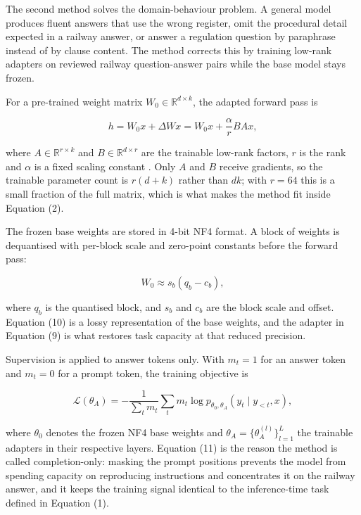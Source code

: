 \documentclass{article}
\begin{document}
The second method solves the domain-behaviour problem. A general model produces fluent answers that use the wrong register, omit the procedural detail expected in a railway answer, or answer a regulation question by paraphrase instead of by clause content. The method corrects this by training low-rank adapters on reviewed railway question-answer pairs while the base model stays frozen.

For a pre-trained weight matrix $W_0\in\mathbb{R}^{d\times k}$, the adapted forward pass is

\begin{equation}
h=W_0x+\Delta Wx=W_0x+\frac{\alpha}{r}BAx,
\end{equation}

where $A\in\mathbb{R}^{r\times k}$ and $B\in\mathbb{R}^{d\times r}$ are the trainable low-rank factors, $r$ is the rank and $\alpha$ is a fixed scaling constant \citep{dettmers2023qlora}. Only $A$ and $B$ receive gradients, so the trainable parameter count is $r(d+k)$ rather than $dk$; with $r=64$ this is a small fraction of the full matrix, which is what makes the method fit inside Equation (2).

The frozen base weights are stored in 4-bit NF4 format. A block of weights is dequantised with per-block scale and zero-point constants before the forward pass:

\begin{equation}
W_0 \approx s_b\left(q_b-c_b\right),
\end{equation}

where $q_b$ is the quantised block, and $s_b$ and $c_b$ are the block scale and offset. Equation (10) is a lossy representation of the base weights, and the adapter in Equation (9) is what restores task capacity at that reduced precision.

Supervision is applied to answer tokens only. With $m_t=1$ for an answer token and $m_t=0$ for a prompt token, the training objective is

\begin{equation}
\mathcal{L}(\theta_A)=-\frac{1}{\sum_t m_t}\sum_t m_t\log p_{\theta_0,\theta_A}\!\left(y_t\mid y_{<t},x\right),
\end{equation}

where $\theta_0$ denotes the frozen NF4 base weights and $\theta_A=\{\theta_A^{(l)}\}_{l=1}^{L}$ the trainable adapters in their respective layers. Equation (11) is the reason the method is called completion-only: masking the prompt positions prevents the model from spending capacity on reproducing instructions and concentrates it on the railway answer, and it keeps the training signal identical to the inference-time task defined in Equation (1).
\end{document}
